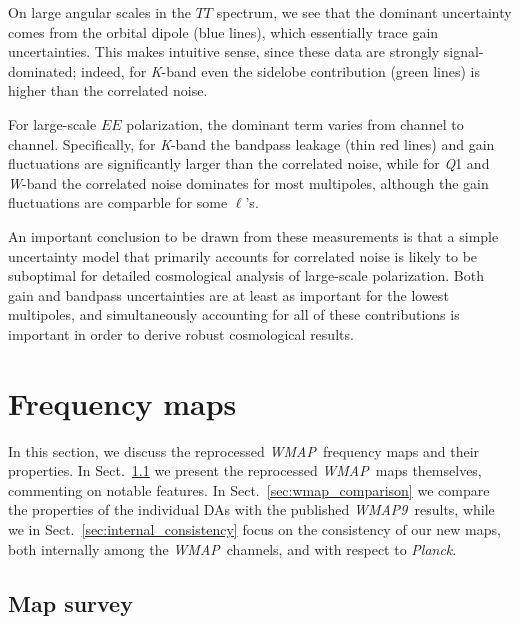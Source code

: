 \documentclass[twocolumn]{../../common/aa}
\def\WMAP{\emph{WMAP}}
\def\WMAPnine{\emph{WMAP9}}
\def\Planck{\emph{Planck}}
\newcommand{\K}[0]{\textit K}
\newcommand{\Q}[0]{\textit Q}
\newcommand{\W}[0]{\textit W}
\begin{document}
On large angular scales in the $TT$ spectrum, we see that the dominant uncertainty comes from the orbital dipole (blue lines), which essentially trace gain uncertainties. This makes intuitive sense, since these data are strongly signal-dominated; indeed, for \K-band even the sidelobe contribution (green lines) is higher than the correlated noise.

For large-scale $EE$ polarization, the dominant term varies from channel to channel. Specifically, for \K-band the bandpass leakage (thin red lines) and gain fluctuations are significantly larger than the correlated noise, while for \Q1 and \W-band the correlated noise dominates for most multipoles, although the gain fluctuations are comparble for some $\ell$'s.

An important conclusion to be drawn from these measurements is that a simple uncertainty model that primarily accounts for correlated noise is likely to be suboptimal for detailed cosmological analysis of large-scale polarization. Both gain and bandpass uncertainties are at least as important for the lowest multipoles, and simultaneously accounting for all of these contributions is important in order to derive robust cosmological results.






\section{Frequency maps}
\label{sec:maps}

In this section, we discuss the reprocessed \WMAP\ frequency maps and their properties. In Sect.~\ref{ssec:means} we present the reprocessed \WMAP\ maps themselves, commenting on notable features. In Sect.~\ref{sec:wmap_comparison} we compare the properties of the individual DAs with the published \WMAPnine\ results, while we in Sect.~\ref{sec:internal_consistency} focus on the consistency of our new maps, both internally among the \WMAP\ channels, and with respect to \Planck. 

\subsection{Map survey}
\label{ssec:means}
\end{document}
